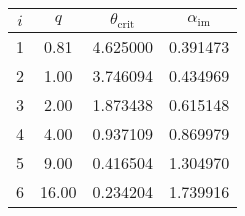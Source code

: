 \begin{tabular*}{\textwidth}{@{\extracolsep{\fill}}cccc} \\
\toprule
$i$ & $q$ & $\theta_\text{crit}$ & $\alpha_\text{im}$ \\
\midrule
1 & \num{0.81} & 4.625000 & 0.391473 \\
2 & \num{1.00} & 3.746094 & 0.434969 \\
3 & \num{2.00} & 1.873438 & 0.615148 \\
4 & \num{4.00} & 0.937109 & 0.869979 \\
5 & \num{9.00} & 0.416504 & 1.304970 \\
6 & \num{16.00} & 0.234204 & 1.739916 \\
\bottomrule
\end{tabular*}
